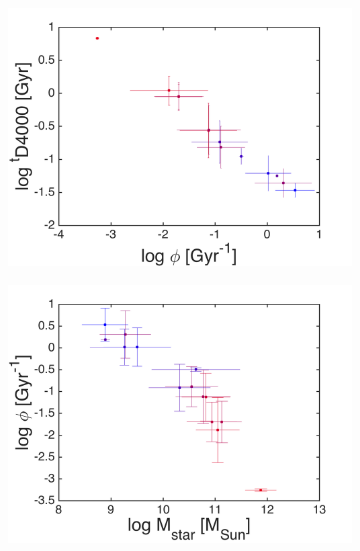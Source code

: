        \begin{figure}
        \begin{subfigure}[b]{0.3\textwidth}
            \includegraphics[width=\textwidth]{../images0.01/1d/f1.png}
        \end{subfigure}
        \hfill
        \begin{subfigure}[b]{0.3\textwidth}
            \includegraphics[width=\textwidth]{../images0.01/1d/f2.png}
        \end{subfigure}
        \hfill
        \begin{subfigure}[b]{0.3\textwidth}

\end{subfigure}
\end{figure}
